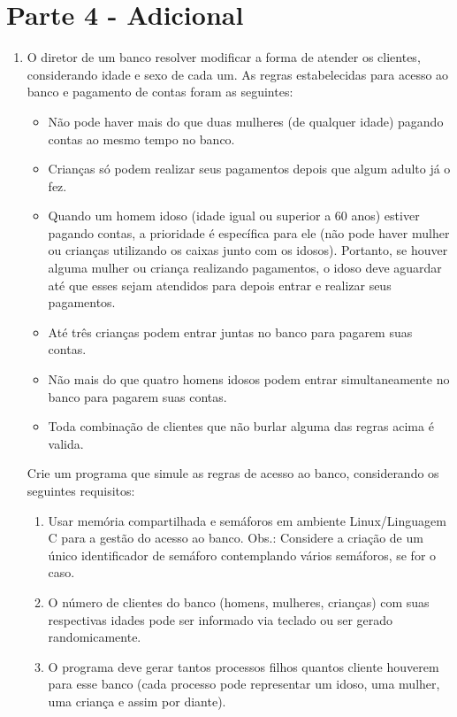 \documentclass[a4paper,10pt]{article}
\begin{document}
\section{Parte 4 - Adicional}
\begin{enumerate}
  \item O diretor de um banco resolver modificar a forma de atender os clientes, considerando idade e sexo de cada um. As regras estabelecidas 
	para acesso ao banco e pagamento de contas foram as seguintes:
      \begin{itemize}
       \item Não pode haver mais do que duas mulheres (de qualquer idade) pagando contas ao mesmo tempo no banco.
       \item Crianças só podem realizar seus pagamentos depois que algum adulto já o fez.
       \item Quando um homem idoso (idade igual ou superior a 60 anos) estiver pagando contas, a prioridade é específica para ele (não pode haver 
	    mulher ou crianças utilizando os caixas junto com os idosos). Portanto, se houver alguma mulher ou criança realizando pagamentos, o 
	    idoso deve aguardar até que esses sejam atendidos para depois entrar e realizar seus pagamentos.
       \item Até três crianças podem entrar juntas no banco para pagarem suas contas.
       \item Não mais do que quatro homens idosos podem entrar simultaneamente no banco para pagarem suas contas.
       \item Toda combinação de clientes que não burlar alguma das regras acima é valida.
      \end{itemize}
	Crie um programa que simule as regras de acesso ao banco, considerando os seguintes requisitos:
      \begin{enumerate}
       \item Usar memória compartilhada e semáforos em ambiente Linux/Linguagem C para a gestão do acesso ao banco. Obs.: Considere a criação de 
	    um único identificador de semáforo contemplando vários semáforos, se for o caso.
       \item O número de clientes do banco (homens, mulheres, crianças) com suas respectivas idades pode ser informado via teclado ou ser gerado 
	    randomicamente.
       \item O programa deve gerar tantos processos filhos quantos cliente houverem para esse banco (cada processo pode representar um idoso, uma 
	    mulher, uma criança e assim por diante).

\end{enumerate}
\end{enumerate}
\end{document}
